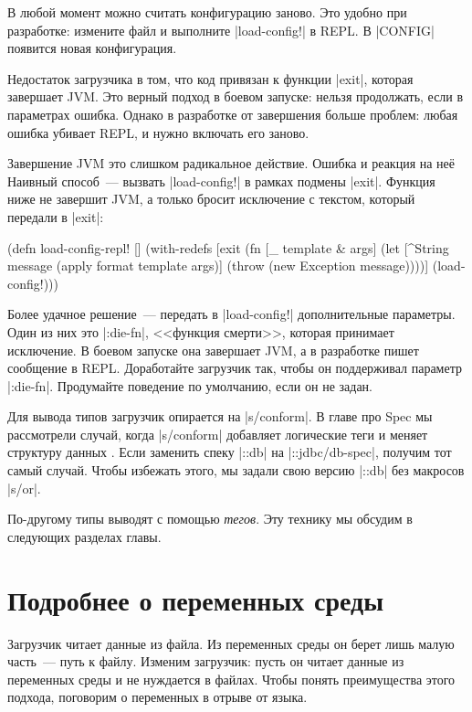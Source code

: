 В любой момент можно считать конфигурацию заново. Это удобно при разработке:
измените файл и выполните \spverb|load-config!| в REPL. В \spverb|CONFIG|
появится новая конфигурация.

Недостаток загрузчика в том, что код привязан к функции \spverb|exit|, которая
завершает JVM. Это верный подход в боевом запуске: нельзя продолжать, если в
параметрах ошибка. Однако в разработке от завершения больше проблем: любая
ошибка убивает REPL, и нужно включать его заново.

Завершение JVM это слишком радикальное действие. Ошибка и реакция на не\"{е}
Наивный способ~--- вызвать \spverb|load-config!| в рамках подмены
\spverb|exit|. Функция ниже не завершит JVM, а только бросит исключение с
текстом, который передали в \spverb|exit|:

\begin{english}
  \begin{clojure}
(defn load-config-repl! []
  (with-redefs
    [exit (fn [_ template & args]
            (let [^String message
                  (apply format template args)]
              (throw (new Exception message))))]
    (load-config!)))
  \end{clojure}
\end{english}

Более удачное решение~--- передать в \spverb|load-config!| дополнительные
параметры. Один из них это \spverb|:die-fn|, <<функция смерти>>, которая
принимает исключение. В боевом запуске она завершает JVM, а в разработке пишет
сообщение в REPL. Доработайте загрузчик так, чтобы он поддерживал параметр
\spverb|:die-fn|. Продумайте поведение по умолчанию, если он не задан.

Для вывода типов загрузчик опирается на \spverb|s/conform|. В главе про Spec мы
рассмотрели случай, когда \spverb|s/conform| добавляет логические теги и меняет
структуру данных . Если заменить спеку \spverb|::db|
на \spverb|::jdbc/db-spec|, получим тот самый случай. Чтобы избежать этого, мы
задали свою версию \spverb|::db| без макросов \spverb|s/or|.

По-другому типы выводят с помощью \emph{тегов}. Эту технику мы обсудим в
следующих разделах главы.

\section{Подробнее о переменных среды}

Загрузчик читает данные из файла. Из переменных среды он берет лишь малую
часть~--- путь к файлу. Изменим загрузчик: пусть он читает данные из переменных
среды и не нуждается в файлах. Чтобы понять преимущества этого подхода,
поговорим о переменных в отрыве от языка.

